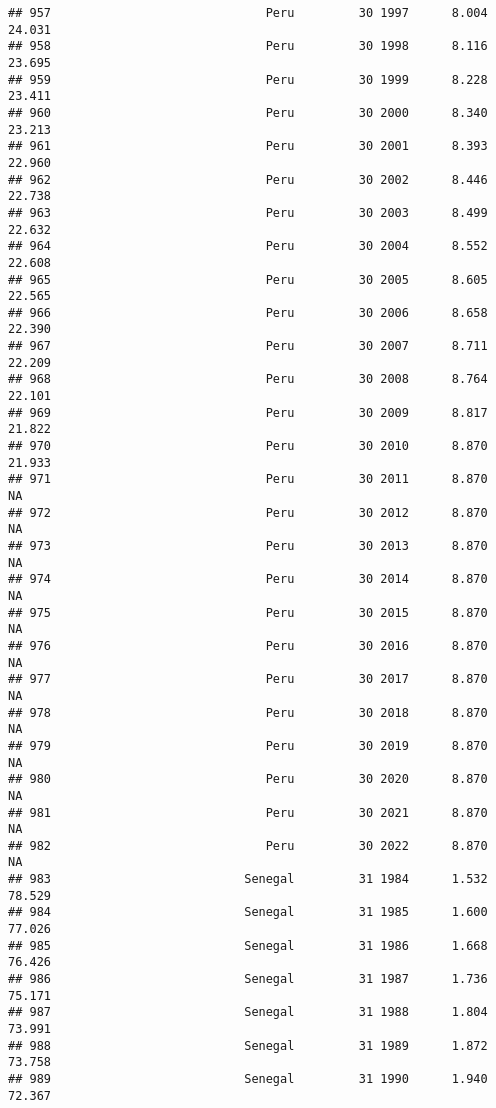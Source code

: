 \documentclass[
]{article}
\begin{document}
\begin{verbatim}
## 957                              Peru         30 1997      8.004     24.031
## 958                              Peru         30 1998      8.116     23.695
## 959                              Peru         30 1999      8.228     23.411
## 960                              Peru         30 2000      8.340     23.213
## 961                              Peru         30 2001      8.393     22.960
## 962                              Peru         30 2002      8.446     22.738
## 963                              Peru         30 2003      8.499     22.632
## 964                              Peru         30 2004      8.552     22.608
## 965                              Peru         30 2005      8.605     22.565
## 966                              Peru         30 2006      8.658     22.390
## 967                              Peru         30 2007      8.711     22.209
## 968                              Peru         30 2008      8.764     22.101
## 969                              Peru         30 2009      8.817     21.822
## 970                              Peru         30 2010      8.870     21.933
## 971                              Peru         30 2011      8.870         NA
## 972                              Peru         30 2012      8.870         NA
## 973                              Peru         30 2013      8.870         NA
## 974                              Peru         30 2014      8.870         NA
## 975                              Peru         30 2015      8.870         NA
## 976                              Peru         30 2016      8.870         NA
## 977                              Peru         30 2017      8.870         NA
## 978                              Peru         30 2018      8.870         NA
## 979                              Peru         30 2019      8.870         NA
## 980                              Peru         30 2020      8.870         NA
## 981                              Peru         30 2021      8.870         NA
## 982                              Peru         30 2022      8.870         NA
## 983                           Senegal         31 1984      1.532     78.529
## 984                           Senegal         31 1985      1.600     77.026
## 985                           Senegal         31 1986      1.668     76.426
## 986                           Senegal         31 1987      1.736     75.171
## 987                           Senegal         31 1988      1.804     73.991
## 988                           Senegal         31 1989      1.872     73.758
## 989                           Senegal         31 1990      1.940     72.367

\end{verbatim}
\end{document}

